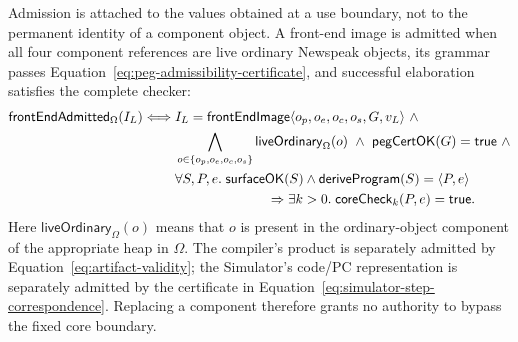 Admission is attached to the values obtained at a use boundary, not to the
permanent identity of a component object.  A front-end image is admitted when
all four component references are live ordinary Newspeak objects, its grammar
passes Equation~\eqref{eq:peg-admissibility-certificate}, and successful
elaboration satisfies the complete checker:
\begin{equation}\label{eq:front-end-artifact-admission}
\begin{split}
 \mathsf{frontEndAdmitted}_{\Omega}(I_L)\Longleftrightarrow{}&
 I_L=\kw{frontEndImage}\langle o_p,o_e,o_c,o_s,G,v_L\rangle\ \land\\
 &\bigwedge_{o\in\{o_p,o_e,o_c,o_s\}}\mathsf{liveOrdinary}_{\Omega}(o)
 \ \land\ \mathsf{pegCertOK}(G)=\kw{true}\ \land\\
 &\forall S,P,e.\;
   \mathsf{surfaceOK}(S)\land
   \mathsf{deriveProgram}(S)=\langle P,e\rangle\\
 &\hspace{24mm}\Rightarrow\exists k>0.\;
       \mathsf{coreCheck}_{k}(P,e)=\kw{true}.
\end{split}
\end{equation}
Here $\mathsf{liveOrdinary}_{\Omega}(o)$ means that $o$ is present in the
ordinary-object component of the appropriate heap in $\Omega$.
The compiler's product is separately admitted by
Equation~\eqref{eq:artifact-validity}; the Simulator's code/PC representation
is separately admitted by the certificate in
Equation~\eqref{eq:simulator-step-correspondence}.  Replacing a component
therefore grants no authority to bypass the fixed core boundary.

